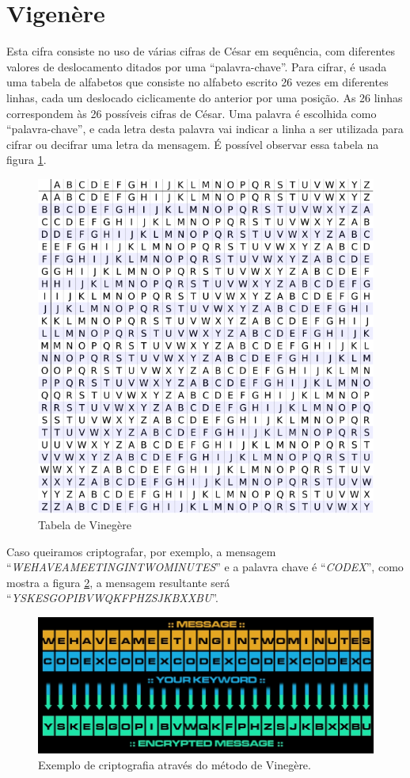 \documentclass[
article,			%
11pt,				%
oneside,			%
a4paper,			%
english,			%
brazil,				%
sumario=tradicional
]{abntex2}
\begin{document}
		
	\section{Vigenère}
		Esta cifra consiste no uso de várias cifras de César em sequência, com diferentes valores de deslocamento ditados por uma ``palavra-chave''. Para cifrar, é usada uma tabela de alfabetos que consiste no alfabeto escrito 26 vezes em diferentes linhas, cada um deslocado ciclicamente do anterior por uma posição. As 26 linhas correspondem às 26 possíveis cifras de César. Uma palavra é escolhida como ``palavra-chave'', e cada letra desta palavra vai indicar a linha a ser utilizada para cifrar ou decifrar uma letra da mensagem. É possível observar essa tabela na figura \ref{fig:vinegere}.		
		
		\begin{figure}[!h]
			\centering
			\includegraphics[width=0.7\linewidth]{Imagens/vinegere}
			\caption{Tabela de Vinegère}
			\label{fig:vinegere}
		\end{figure}

		
		Caso queiramos criptografar, por exemplo, a mensagem ``\textit{WEHAVEAMEETINGINTWOMINUTES}'' e a palavra chave é ``\textit{CODEX}'', como mostra a figura \ref{fig:venegere2}, a mensagem resultante será ``\textit{YSKESGOPIBVWQKFPHZSJKBXXBU}''.
			
		\begin{figure} [h!]
			\centering
			\includegraphics[width=0.7\linewidth]{Imagens/vinegere2.png}
			\caption{Exemplo de criptografia através do método de Vinegère.}
			\label{fig:venegere2}
		\end{figure}
		
\end{document}
